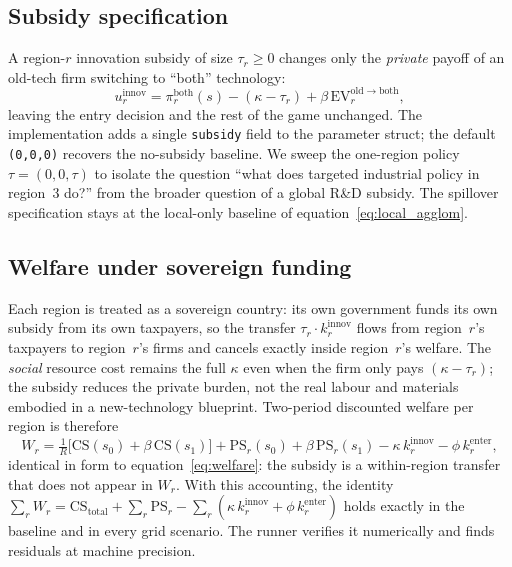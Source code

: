 \documentclass[12pt]{article}
\begin{document}
\subsection{Subsidy specification}

A region-$r$ innovation subsidy of size $\tau_r \ge 0$ changes only the
\emph{private} payoff of an old-tech firm switching to ``both''
technology:
\begin{equation}
  u^{\mathrm{innov}}_r
    = \pi^{\mathrm{both}}_r(s) - (\kappa - \tau_r)
      + \beta\, \mathrm{EV}^{\mathrm{old}\to\mathrm{both}}_r,
  \label{eq:subsidy_payoff}
\end{equation}
leaving the entry decision and the rest of the game unchanged. The
implementation adds a single \texttt{subsidy} field to the parameter
struct; the default \texttt{(0,0,0)} recovers the
no-subsidy baseline. We sweep the one-region policy
$\tau = (0, 0, \tau)$ to isolate the question ``what does targeted
industrial policy in region~3 do?'' from the broader question of a
global R\&D subsidy. The spillover specification stays at the local-only
baseline of equation~\eqref{eq:local_agglom}.

\subsection{Welfare under sovereign funding}

Each region is treated as a sovereign country: its own government funds
its own subsidy from its own taxpayers, so the transfer
$\tau_r \cdot k^{\mathrm{innov}}_r$ flows from region~$r$'s taxpayers to
region~$r$'s firms and cancels exactly inside region~$r$'s welfare. The
\emph{social} resource cost remains the full $\kappa$ even when the firm
only pays $(\kappa - \tau_r)$; the subsidy reduces the private burden,
not the real labour and materials embodied in a new-technology
blueprint. Two-period discounted welfare per region is therefore
\begin{equation}
  W_r
    = \tfrac{1}{R}\bigl[\mathrm{CS}(s_0) + \beta\, \mathrm{CS}(s_1)\bigr]
    + \mathrm{PS}_r(s_0) + \beta\, \mathrm{PS}_r(s_1)
    - \kappa\, k^{\mathrm{innov}}_r - \phi\, k^{\mathrm{enter}}_r,
  \label{eq:welfare_subsidy}
\end{equation}
identical in form to equation~\eqref{eq:welfare}: the subsidy is a
within-region transfer that does not appear in $W_r$. With this
accounting, the identity
$\sum_r W_r = \mathrm{CS}_{\mathrm{total}} + \sum_r \mathrm{PS}_r
- \sum_r (\kappa\, k^{\mathrm{innov}}_r + \phi\, k^{\mathrm{enter}}_r)$
holds exactly in the baseline and in every grid scenario. The runner
verifies it numerically and finds residuals at machine precision.
\end{document}
